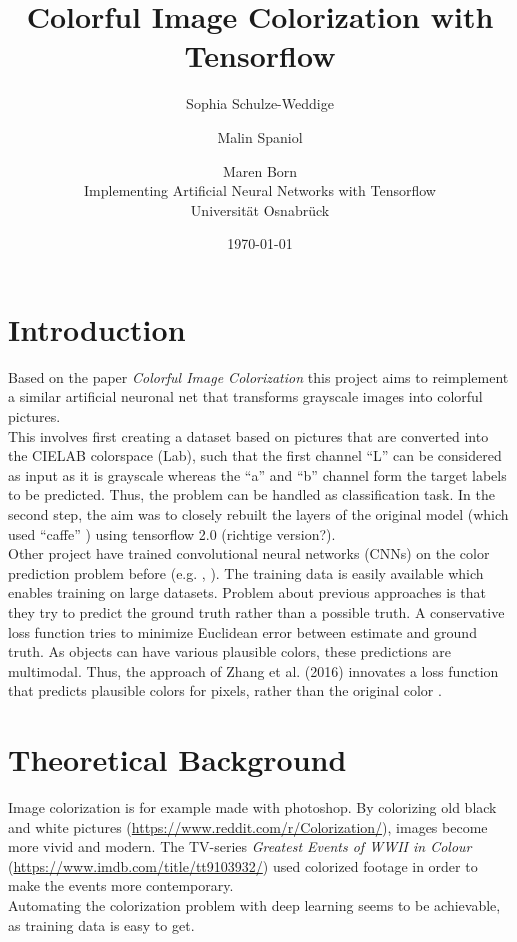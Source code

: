 \documentclass[12pt,letterpaper]{article}
\title{Colorful Image Colorization with Tensorflow}
\date{\today}
\author{Sophia Schulze-Weddige \and Malin Spaniol \and Maren Born \\Implementing Artificial Neural Networks with Tensorflow \\Universität Osnabrück}
\begin{document}
\maketitle
\thispagestyle{empty}
\newpage
\thispagestyle{empty}
\tableofcontents
\newpage
\section{Introduction}
Based on the paper \emph{Colorful Image Colorization} \citep{Zhang.2016} this project aims to reimplement a similar artificial neuronal net that transforms grayscale images into colorful pictures.\\
This involves first creating a dataset based on pictures that are converted into the CIELAB colorspace (Lab), such that the first channel \enquote{L} can be considered as input as it is grayscale whereas the \enquote{a} and \enquote{b} channel form the target labels to be predicted. Thus, the problem can be handled as classification task. In the second step, the aim was to closely rebuilt the layers of the original model (which used \enquote{caffe} \citep{jia2014caffe}) using tensorflow 2.0 (richtige version?).\\
Other project have trained convolutional neural networks (CNNs) on the color prediction problem before (e.g. \cite{Cheng_2015}, \cite{Dahl.2016}). The training data is easily available which enables training on large datasets. Problem about previous approaches is that they try to predict the ground truth rather than a possible truth. A conservative loss function tries to minimize Euclidean error between estimate and ground truth. As objects can have various plausible colors, these predictions are multimodal. Thus, the approach of Zhang et al. (2016) innovates a loss function that predicts plausible colors for pixels, rather than the original color \citep{Zhang.2016}.\\

\section{Theoretical Background}
Image colorization is for example made with photoshop. By colorizing old black and white pictures (\url{https://www.reddit.com/r/Colorization/}), images become more vivid and modern. The TV-series \emph{Greatest Events of WWII in Colour} (\url{https://www.imdb.com/title/tt9103932/}) used colorized footage in order to make the events more contemporary.\\
Automating the colorization problem with deep learning seems to be achievable, as training data is easy to get.\\
\end{document}
